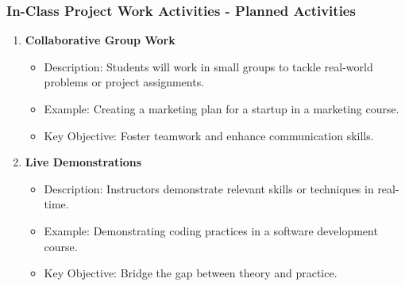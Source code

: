 \documentclass[aspectratio=169]{beamer}
\begin{document}
\begin{frame}[fragile]
  \frametitle{In-Class Project Work Activities - Planned Activities}
  \begin{enumerate}
    \item \textbf{Collaborative Group Work}
      \begin{itemize}
        \item Description: Students will work in small groups to tackle real-world problems or project assignments.
        \item Example: Creating a marketing plan for a startup in a marketing course.
        \item Key Objective: Foster teamwork and enhance communication skills.
      \end{itemize}
      
    \item \textbf{Live Demonstrations}
      \begin{itemize}
        \item Description: Instructors demonstrate relevant skills or techniques in real-time.
        \item Example: Demonstrating coding practices in a software development course.
        \item Key Objective: Bridge the gap between theory and practice.
      \end{itemize}
  \end{enumerate}
\end{frame}
\end{document}
